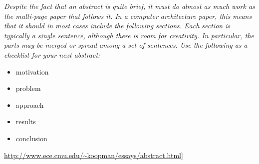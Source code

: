 \textit{
Despite the fact that an abstract is quite brief, it must do almost as much work as the multi-page paper that follows it. 
In a computer architecture paper, this means that it should in most cases include the following sections.
Each section is typically a single sentence, although there is room for creativity. 
In particular, the parts may be merged or spread among a set of sentences. Use the following as a checklist for your next abstract: 
}

\begin{itemize}
 \item motivation
 \item problem
 \item approach
 \item results
 \item conclusion
\end{itemize}

\url{http://www.ece.cmu.edu/~koopman/essays/abstract.html}]

\tableofcontents


\listoffigures